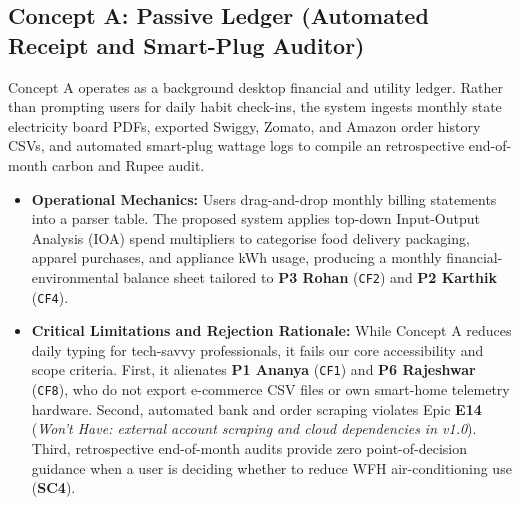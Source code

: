 \documentclass[12pt, a4paper]{article}
\begin{document}
\subsection{Concept A: Passive Ledger (Automated Receipt and Smart-Plug Auditor)}
Concept A operates as a background desktop financial and utility ledger. Rather than prompting users for daily habit check-ins, the system ingests monthly state electricity board PDFs, exported Swiggy, Zomato, and Amazon order history CSVs, and automated smart-plug wattage logs to compile an retrospective end-of-month carbon and Rupee audit.
\begin{itemize}
    \item \textbf{Operational Mechanics:} Users drag-and-drop monthly billing statements into a parser table. The proposed system applies top-down Input-Output Analysis (IOA) spend multipliers to categorise food delivery packaging, apparel purchases, and appliance kWh usage, producing a monthly financial-environmental balance sheet tailored to \textbf{P3 Rohan} (\texttt{CF2}) and \textbf{P2 Karthik} (\texttt{CF4}).
    \item \textbf{Critical Limitations and Rejection Rationale:} While Concept A reduces daily typing for tech-savvy professionals, it fails our core accessibility and scope criteria. First, it alienates \textbf{P1 Ananya} (\texttt{CF1}) and \textbf{P6 Rajeshwar} (\texttt{CF8}), who do not export e-commerce CSV files or own smart-home telemetry hardware. Second, automated bank and order scraping violates Epic \textbf{E14} (\textit{Won't Have: external account scraping and cloud dependencies in v1.0}). Third, retrospective end-of-month audits provide zero point-of-decision guidance when a user is deciding whether to reduce WFH air-conditioning use (\textbf{SC4}).
\end{itemize}
\end{document}
